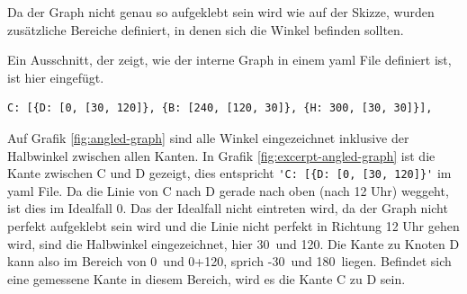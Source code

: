 Da der Graph nicht genau so aufgeklebt sein wird wie auf der Skizze, wurden zusätzliche Bereiche definiert, in denen sich die Winkel befinden sollten.

Ein Ausschnitt, der zeigt, wie der interne Graph in einem \gls{yaml} File definiert ist, ist hier eingefügt.

\begin{verbatim}
C: [{D: [0, [30, 120]}, {B: [240, [120, 30]}, {H: 300, [30, 30]}],
\end{verbatim}

Auf Grafik \ref{fig:angled-graph} sind alle Winkel eingezeichnet inklusive der Halbwinkel zwischen allen Kanten. In Grafik \ref{fig:excerpt-angled-graph} ist die Kante zwischen C und D gezeigt, dies entspricht \verb|'C: [{D: [0, [30, 120]}'| im \gls{yaml} File. Da die Linie von C nach D gerade nach oben (nach 12 Uhr) weggeht, ist dies im Idealfall 0\textdegree.
Das der Idealfall nicht eintreten wird, da der Graph nicht perfekt aufgeklebt sein wird und die Linie nicht perfekt in Richtung 12 Uhr gehen wird, sind die Halbwinkel eingezeichnet, hier 30\textdegree\ und 120\textdegree. Die Kante zu Knoten D kann also im Bereich von 0\textdegree\ und 0\textdegree+120\textdegree, sprich -30\textdegree\ und 180\textdegree\ liegen. Befindet sich eine gemessene Kante in diesem Bereich, wird es die Kante C zu D sein.

